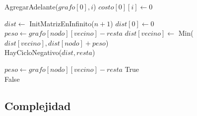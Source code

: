 \begin{algorithm}[H]
\begin{algorithmic}
    
	\For{$i \in [1..n)$}    
		\State AgregarAdelante($grafo[0], i$)    
		\State $costo[0][i] \gets 0$    
	\EndFor
\EndFunction
\end{algorithmic}
\end{algorithm}

\begin{algorithm}[H]
\begin{algorithmic}
    
	\State $dist \gets$ InitMatrizEnInfinito($n + 1$)    
	\State $dist[0] \gets 0$    
	\For{$i \in [1..n)$}    
		    
			    
				\State $peso \gets grafo[nodo][vecino] - resta$    
				\State $dist[vecino] \gets$ Min($dist[vecino], dist[nodo] + peso$)      \\
			\EndFor
		\EndFor
	\EndFor
	\Return HayCicloNegativo($dist, resta$)    
\EndFunction
\end{algorithmic}
\end{algorithm}

\begin{algorithm}[H]
\begin{algorithmic}
    
	    
		    
			\State $peso \gets grafo[nodo][vecino] - resta$    
			    
				\State \Return True      \\
			\EndIf
		\EndFor
	\EndFor
	\Return False    
\EndFunction
\end{algorithmic}
\end{algorithm}

\newpage

\subsection{Complejidad}

